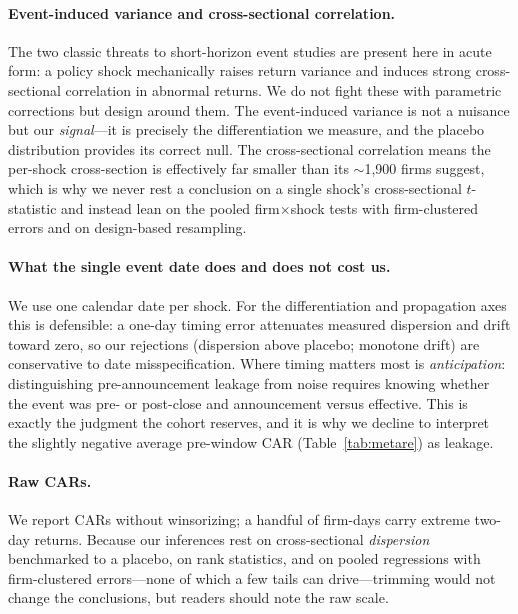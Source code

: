 \documentclass[12pt]{article}
\begin{document}
\paragraph{Event-induced variance and cross-sectional correlation.} The two classic threats to
short-horizon event studies \citep{boehmer1991,kolari2010} are present here in acute form: a policy
shock mechanically raises return variance and induces strong cross-sectional correlation in abnormal
returns. We do not fight these with parametric corrections but design around them. The event-induced
variance is not a nuisance but our \emph{signal}---it is precisely the differentiation we measure,
and the placebo distribution provides its correct null. The cross-sectional correlation means the
per-shock cross-section is effectively far smaller than its $\sim$1{,}900 firms suggest, which is why
we never rest a conclusion on a single shock's cross-sectional $t$-statistic and instead lean on the
pooled firm$\times$shock tests with firm-clustered errors and on design-based resampling.

\paragraph{What the single event date does and does not cost us.} We use one calendar date per shock.
For the differentiation and propagation axes this is defensible: a one-day timing error attenuates
measured dispersion and drift toward zero, so our rejections (dispersion above placebo; monotone
drift) are conservative to date misspecification. Where timing matters most is \emph{anticipation}:
distinguishing pre-announcement leakage from noise requires knowing whether the event was pre- or
post-close and announcement versus effective. This is exactly the judgment the cohort reserves, and
it is why we decline to interpret the slightly negative average pre-window CAR
(Table~\ref{tab:metare}) as leakage.

\paragraph{Raw CARs.} We report CARs without winsorizing; a handful of firm-days carry extreme
two-day returns. Because our inferences rest on cross-sectional \emph{dispersion} benchmarked to a
placebo, on rank statistics, and on pooled regressions with firm-clustered errors---none of which a
few tails can drive---trimming would not change the conclusions, but readers should note the raw
scale.
\end{document}
